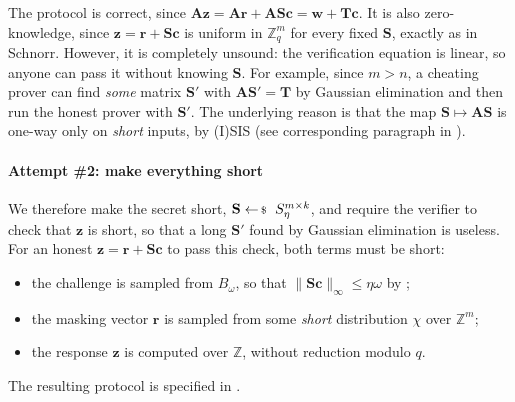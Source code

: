\documentclass[../../book.tex]{subfiles}
\begin{document}
The protocol is correct, since $\mathbf{A}\mathbf{z} = \mathbf{A}\mathbf{r} + \mathbf{A}\mathbf{S}\mathbf{c} = \mathbf{w} + \mathbf{T}\mathbf{c}$.
It is also zero-knowledge, since $\mathbf{z} = \mathbf{r} + \mathbf{S}\mathbf{c}$ is uniform in $\mathbb{Z}_q^m$ for every fixed $\mathbf{S}$, exactly as in Schnorr.
However, it is completely unsound: the verification equation is linear, so anyone can pass it without knowing $\mathbf{S}$.
For example, since $m > n$, a cheating prover can find \emph{some} matrix $\mathbf{S}'$ with $\mathbf{A}\mathbf{S}' = \mathbf{T}$ by Gaussian elimination and then run the honest prover with $\mathbf{S}'$.
The underlying reason is that the map $\mathbf{S} \mapsto \mathbf{A}\mathbf{S}$ is one-way only on \emph{short} inputs, by (I)SIS (see corresponding paragraph in ).

\paragraph{Attempt \#2: make everything short}
We therefore make the secret short, $\mathbf{S} \leftarrowS S_{\eta}^{m \times k}$, and require the verifier to check that $\mathbf{z}$ is short, so that a long $\mathbf{S}'$ found by Gaussian elimination is useless.
For an honest $\mathbf{z} = \mathbf{r} + \mathbf{S}\mathbf{c}$ to pass this check, both terms must be short:
\begin{itemize}
    \item the challenge is sampled from $B_{\omega}$, so that $\|\mathbf{S}\mathbf{c}\|_{\infty} \leq \eta\omega$ by ;
    \item the masking vector $\mathbf{r}$ is sampled from some \emph{short} distribution $\chi$ over $\mathbb{Z}^m$;
    \item the response $\mathbf{z}$ is computed over $\mathbb{Z}$, without reduction modulo $q$.
\end{itemize}
The resulting protocol is specified in .
\end{document}
